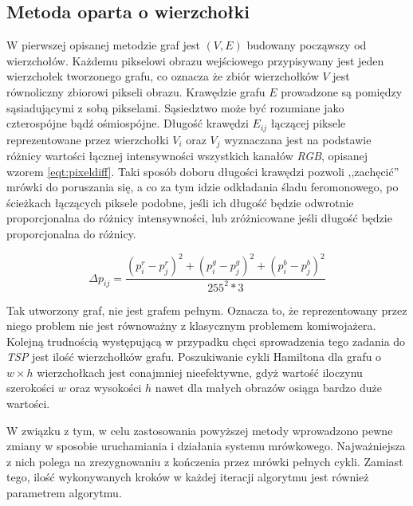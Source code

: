 {{        %
        \subsection{Metoda oparta o wierzchołki}
        {
            W pierwszej opisanej metodzie graf jest $(V, E)$ budowany począwszy od wierzchołów. Każdemu pikselowi obrazu
            wejściowego przypisywany jest jeden wierzchołek tworzonego grafu, co oznacza że zbiór wierzchołków $V$ jest
            równoliczny zbiorowi pikseli obrazu. Krawędzie grafu $E$ prowadzone są pomiędzy sąsiadującymi z sobą
            pikselami. Sąsiedztwo może być rozumiane jako czterospójne bądź ośmiospójne.
            Długość krawędzi $E_{ij}$ łączącej piksele reprezentowane przez wierzchołki $V_i$ oraz $V_j$ wyznaczana jest
            na podstawie różnicy wartości łącznej intensywności wszystkich kanałów \textit{RGB}, opisanej wzorem
            \ref{eqt:pixeldiff}. Taki sposób doboru długości krawędzi pozwoli ,,zachęcić'' mrówki do poruszania się, a
            co za tym idzie odkładania śladu feromonowego, po ścieżkach łączących piksele podobne, jeśli ich długość
            będzie odwrotnie proporcjonalna do różnicy intensywności, lub zróżnicowane jeśli długość będzie
            proporcjonalna do różnicy.

            \begin{equation}\label{eqt:pixeldiff}
                \Delta p_{ij} = \frac{(p_i^r - p_j^r)^2 + (p_i^g - p_j^g)^2 + (p_i^b - p_j^b)^2}{255^2 * 3}
            \end{equation}

            Tak utworzony graf, nie jest grafem pełnym. Oznacza to, że reprezentowany przez niego problem nie jest
            równoważny z klasycznym problemem komiwojażera. Kolejną trudnością występującą w przypadku chęci
            sprowadzenia tego zadania do \textit{TSP} jest ilość wierzchołków grafu. Poszukiwanie cykli Hamiltona dla
            grafu o $w \times h$ wierzchołkach jest conajmniej nieefektywne, gdyż wartość iloczynu szerokości $w$ oraz
            wysokości $h$ nawet dla małych obrazów osiąga bardzo duże wartości.

            W związku z tym, w celu zastosowania powyższej metody wprowadzono pewne zmiany w sposobie uruchamiania i
            działania systemu mrówkowego. Najważniejsza z nich polega na zrezygnowaniu z kończenia przez mrówki pełnych
            cykli. Zamiast tego, ilość wykonywanych kroków w każdej iteracji algorytmu jest również parametrem
            algorytmu.

}}}
